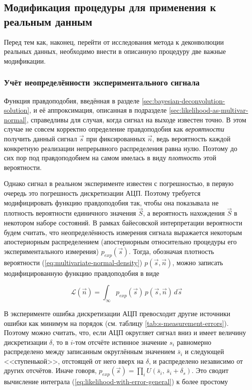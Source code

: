 \subsection{Модификация процедуры для применения к реальным данным}

Перед тем как, наконец, перейти от исследования метода к деконволюции реальных данных, необходимо внести в описанную процедуру две важные модификации.

\subsubsection{Учёт неопределённости экспериментального сигнала}

\label{sec:likelihood-with-error-in-signal}

Функция правдоподобия, введённая в разделе \ref{sec:bayesian-deconvolution-solution}, и её аппроксимация, описанная в подразделе \ref{sec:likelihood-as-multivar-normal}, справедливы для случая, когда сигнал на выходе известен точно. В этом случае не совсем корректно определение правдоподобия как \textit{вероятности} получить данный сигнал $\vec{s}$ при фиксированных $\vec{n}$, ведь вероятность каждой конкретную реализации непрерывного распределения равна нулю. Поэтому до сих пор под правдоподобием на самом имелась в виду \textit{плотность} этой вероятности.

Однако сигнал в реальном эксперименте известен с погрешностью, в первую очередь это погрешность дискретизации АЦП. Поэтому требуется модифицировать функцию правдоподобия так, чтобы она показывала не плотность вероятности единичного значения $\vec{S}$, а вероятность нахождения $\vec{S}$ в некотором наборе состояний. В рамках байесовской интерпретации вероятности будем считать, что неопределённость измерения сигнала выражается некоторым апостериорным распределением (апостериорным относительно процедуры его экспериментального измерения) $p_{exp}(\vec{s})$. Тогда, обозначая плотность вероятности (\ref{eq:multivariate-normal-density}) $p(\vec{s}, \vec{n})$, можно записать модифицированную функцию правдоподобия в виде

\begin{equation}
	\label{eq:likelihood-with-error-general}
	\mathcal{L}(\vec{n}) = \int_{\infty} p_{exp}(\vec{s}) \, p(\vec{s}, \vec{n}) \, d\vec{s}
\end{equation}

В эксперименте ошибка дискретизации АЦП превосходит другие источники ошибки как минимум на порядок (см. таблицу \ref{tab:s-measurement-errors}). Поэтому можно считать, что, если АЦП округляет сигнал вниз и имеет величину дискретизации $\delta$, то в $i$-том отсчёте истинное значение $s_i$ равномерно распределено между записанным округлённым значением $\bar{s}_i$ и следующей <<ступенькой>>, отстоящей от него вверх на $\delta$, и распределено независимо от других отсчётов. Иначе говоря, $p_{exp}(\vec{s}) = \prod_{i} U( \bar{s}_i, \, \bar{s}_i + \delta_s )$. Это сводит вычисление интеграла (\ref{eq:likelihood-with-error-general}) к более простому

